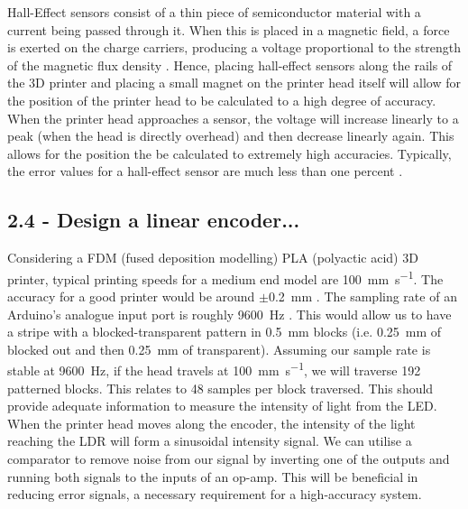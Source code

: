 \documentclass[conference]{IEEEtran}
\begin{document}
Hall-Effect sensors consist of a thin piece of semiconductor material with a current being passed through it. When this is placed in a magnetic field, a force is exerted on the charge carriers, producing a voltage proportional to the strength of the magnetic flux density \cite{b3}. Hence, placing hall-effect sensors along the rails of the 3D printer and placing a small magnet on the printer head itself will allow for the position of the printer head to be calculated to a high degree of accuracy. When the printer head approaches a sensor, the voltage will increase linearly to a peak (when the head is directly overhead) and then decrease linearly again. This allows for the position the be calculated to extremely high accuracies. Typically, the error values for a hall-effect sensor are much less than one percent \cite{b4}.

\subsection*{2.4 - Design a linear encoder...}
Considering a FDM (fused deposition modelling) PLA (polyactic acid) 3D printer, typical printing speeds \cite{b5} for a medium end model are \SI{100}{\milli\meter\per\second}. The accuracy for a good printer would be around $\pm$\SI{0.2}{\milli\meter} \cite{b6}. The sampling rate of an Arduino's analogue input port is roughly \SI{9600}{\hertz} \cite{b7}. This would allow us to have a stripe with a blocked-transparent pattern in \SI{0.5}{\milli\meter} blocks (i.e. \SI{0.25}{\milli\meter} of blocked out and then \SI{0.25}{\milli\meter} of transparent). Assuming our sample rate is stable at \SI{9600}{\hertz}, if the head travels at \SI{100}{\milli\meter\per\second}, we will traverse 192 patterned blocks. This relates to 48 samples per block traversed. This should provide adequate information to measure the intensity of light from the LED. When the printer head moves along the encoder, the intensity of the light reaching the LDR will form a sinusoidal intensity signal. We can utilise a comparator to remove noise from our signal by inverting one of the outputs and running both signals to the inputs of an op-amp. This will be beneficial in reducing error signals, a necessary requirement for a high-accuracy system. 
\end{document}
